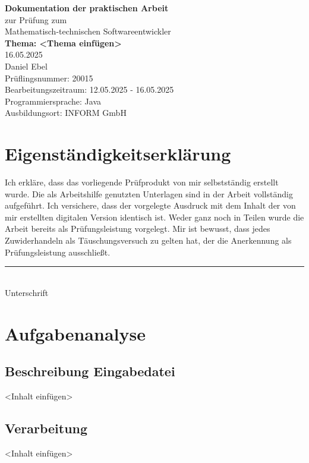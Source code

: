 \documentclass[a4paper,12pt]{report}
\begin{document}
\begin{titlepage}
    \centering
    \vspace*{3cm}
    {\Huge \textbf{Dokumentation der praktischen Arbeit}}\\[2cm]
    {\large zur Prüfung zum \\ Mathematisch-technischen Softwareentwickler}\\[2cm]
    {\Large \textbf{Thema: <Thema einfügen>}}\\[1cm]
    {16.05.2025}\\[5cm]
    {Daniel Ebel}\\[2cm]
    Prüflingsnummer: 20015\\[0.5cm]
    Bearbeitungszeitraum: 12.05.2025 - 16.05.2025\\[0.5cm]
    Programmiersprache: Java\\[0.5cm]
    Ausbildungsort: INFORM GmbH
\end{titlepage}

\chapter*{Eigenständigkeitserklärung}
Ich erkläre, dass das vorliegende Prüfprodukt von mir selbstständig erstellt wurde.
Die als Arbeitshilfe genutzten Unterlagen sind in der Arbeit vollständig aufgeführt.
Ich versichere, dass der vorgelegte Ausdruck mit dem Inhalt der von mir erstellten digitalen Version identisch ist.
Weder ganz noch in Teilen wurde die Arbeit bereits als Prüfungsleistung vorgelegt.
Mir ist bewusst, dass jedes Zuwiderhandeln als Täuschungsversuch zu gelten hat, der die Anerkennung als Prüfungsleistung ausschließt.

\vspace{2cm}

\noindent\rule{7cm}{0.4pt}\\
Unterschrift

\tableofcontents
\listoffigures

\chapter{Aufgabenanalyse}
\section{Beschreibung Eingabedatei}
<Inhalt einfügen>

\section{Verarbeitung}
<Inhalt einfügen>
\end{document}
